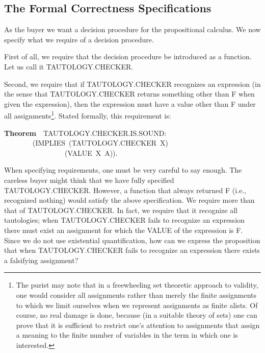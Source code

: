 \documentclass[10pt]{book}
\newenvironment{pubasis}{\begin{flushleft}}{\end{flushleft}}
\newcommand{\axiomordefinition}[1]{\vspace{6pt}\Large\textsf{\textbf{#1}}\normalsize}
\begin{document}
\subsection{The Formal Correctness Specifications}
As the buyer we want a decision procedure for the propositional
calculus.  We now specify what we require of a decision procedure.

First of all, we require that the decision procedure be introduced as a
function.  Let us call it TAUTOLOGY.CHECKER.

Second, we require that if TAUTOLOGY.CHECKER recognizes an expression
(in the sense that TAUTOLOGY.CHECKER returns something other than F
when given the expression), then the expression must have a value
other than F under all assignments\footnote{The purist may  note that in a freewheeling set theoretic approach to validity, one would consider all assignments rather than merely the finite assignments to which we limit ourselves when we represent assignments as finite alists.  Of course, no real damage is done, because (in a suitable theory of sets) one can prove that it is sufficient to restrict one's attention to assignments that assign a meaning to the finite number of variables in the term in which one is interested.}.
Stated formally, this requirement is:
\begin{pubasis}
\axiomordefinition{Theorem}~~TAUTOLOGY.CHECKER.IS.SOUND:\\
~~~~~~~~(IMPLIES~(TAUTOLOGY.CHECKER~X)\\
~~~~~~~~~~~~~~~~~(VALUE~X~A)).\\
\end{pubasis}
When specifying requirements, one must be
very careful to say enough.  The careless buyer might think that we have
fully specified TAUTOLOGY.CHECKER.  However, a function that always returned
F (i.e., recognized nothing) would satisfy the above specification.
We require more than that of
TAUTOLOGY.CHECKER.  In fact, we require that it
recognize all tautologies; when TAUTOLOGY.CHECKER fails to recognize an expression
there must exist an
assignment for which the VALUE of the expression is F.
Since we do not use existential quantification, how can
we express the proposition that when TAUTOLOGY.CHECKER fails
to recognize an expression there exists a falsifying assignment?
\end{document}
